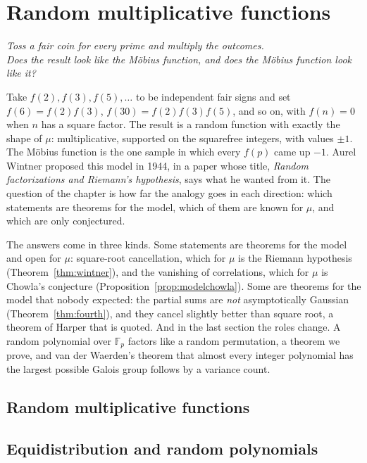 \chapter{Random multiplicative functions}\label{ch:oc-multiplicative}\label{ch:randommult}

\begin{center}\itshape
Toss a fair coin for every prime and multiply the outcomes.\\
Does the result look like the M\"obius function, and does the M\"obius function look like it?
\end{center}

Take $f(2),f(3),f(5),\dots$ to be independent fair signs and set $f(6)=f(2)f(3)$, $f(30)=f(2)f(3)f(5)$, and so on, with $f(n)=0$ when $n$ has a square factor. The result is a random function with exactly the shape of $\mu$: multiplicative, supported on the squarefree integers, with values $\pm1$. The M\"obius function is the one sample in which every $f(p)$ came up $-1$. Aurel Wintner proposed this model in 1944, in a paper whose title, \emph{Random factorizations and Riemann's hypothesis}, says what he wanted from it. The question of the chapter is how far the analogy goes in each direction: which statements are theorems for the model, which of them are known for $\mu$, and which are only conjectured.

The answers come in three kinds. Some statements are theorems for the model and open for $\mu$: square-root cancellation, which for $\mu$ is the Riemann hypothesis (Theorem~\ref{thm:wintner}), and the vanishing of correlations, which for $\mu$ is Chowla's conjecture (Proposition~\ref{prop:modelchowla}). Some are theorems for the model that nobody expected: the partial sums are \emph{not} asymptotically Gaussian (Theorem~\ref{thm:fourth}), and they cancel slightly better than square root, a theorem of Harper that is quoted. And in the last section the roles change. A random polynomial over $\mathbb F_p$ factors like a random permutation, a theorem we prove, and van der Waerden's theorem that almost every integer polynomial has the largest possible Galois group follows by a variance count.

\section{Random multiplicative functions}



\section{Equidistribution and random polynomials}\label{ch:polynomials}

